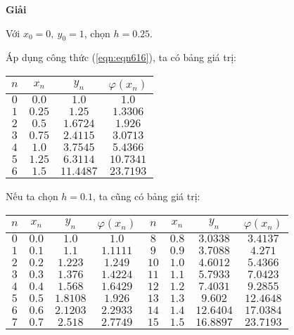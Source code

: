\textbf{Giải}\par
Với $x_0=0,~y_0=1$, chọn $h=0.25$.\par
Áp dụng công thức (\ref{eqn:eqn616}), ta có bảng giá trị:\par
\begin{center}\begin{tabular}{|c|c|c|c|}\hline
	$n$ & $x_n$  & $y_n$     & $\varphi(x_n)$ \\\hline
	$0$ & $0.0$  & $1.0$     & $1.0$     \\\hline
	$1$ & $0.25$ & $1.25$    & $1.3306$  \\\hline
	$2$ & $0.5$  & $1.6724$  & $1.926$   \\\hline
	$3$ & $0.75$ & $2.4115$  & $3.0713$  \\\hline
	$4$ & $1.0$  & $3.7545$  & $5.4366$  \\\hline
	$5$ & $1.25$ & $6.3114$  & $10.7341$ \\\hline
	$6$ & $1.5$  & $11.4487$ & $23.7193$ \\\hline
\end{tabular}\end{center}

Nếu ta chọn $h=0.1$, ta cũng có bảng giá trị:\par
\begin{center}\begin{tabular}{|c|c|c|c||c|c|c|c|}\hline
	$n$ & $x_n$ & $y_n$    & $\varphi(x_n)$ & $n$  & $x_n$  & $y_n$      & $\varphi(x_n)$\\ \hline
	$0$ & $0.0$ & $1.0$    & $1.0$          & $8$  & $0.8$  & $3.0338$  & $3.4137$      \\ \hline
	$1$ & $0.1$ & $1.1$    & $1.1111$       & $9$  & $0.9$  & $3.7088$  & $4.271$       \\ \hline
	$2$ & $0.2$ & $1.223$  & $1.249$        & $10$ & $1.0$  & $4.6012$  & $5.4366$      \\ \hline
	$3$ & $0.3$ & $1.376$  & $1.4224$       & $11$ & $1.1$  & $5.7933$  & $7.0423$      \\ \hline
	$4$ & $0.4$ & $1.568$  & $1.6429$       & $12$ & $1.2$  & $7.4031$  & $9.2855$      \\ \hline
	$5$ & $0.5$ & $1.8108$ & $1.926$        & $13$ & $1.3$  & $9.602$   & $12.4648$     \\ \hline
	$6$ & $0.6$ & $2.1203$ & $2.2933$       & $14$ & $1.4$  & $12.6404$ & $17.0384$     \\ \hline
	$7$ & $0.7$ & $2.518$  & $2.7749$       & $15$ & $1.5$  & $16.8897$ & $23.7193$     \\ \hline
\end{tabular}\end{center}

